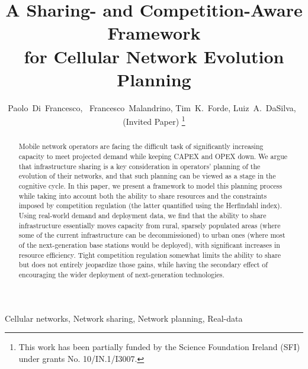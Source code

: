 \documentclass[10pt,journal,cspaper,compsoc]{IEEEtran}
\begin{document}

\title{
A Sharing- and Competition-Aware Framework\\
for Cellular Network Evolution Planning
}
\author{Paolo~Di~Francesco,~
        Francesco~Malandrino, Tim~K.~Forde, Luiz~A.~DaSilva,~\\
        (Invited Paper)
\thanks{This work has been partially funded by the Science Foundation Ireland (SFI) under grants No. 10/IN.1/I3007.}}
\maketitle
\thispagestyle{empty}\pagestyle{plain}

\vspace{-2cm}
\begin{abstract}

Mobile network operators are facing the difficult task of significantly increasing capacity to meet projected
demand while keeping CAPEX and OPEX down. We argue that infrastructure sharing is a key consideration in 
operators' planning of the evolution of their networks, and that such planning can be viewed as a stage in the 
cognitive cycle. In this paper, we present a framework to model this planning process while taking into account 
both the ability to share resources and the constraints imposed by competition regulation (the latter quantified 
using the Herfindahl index). 
Using real-world demand and deployment data, we find that the ability to share infrastructure essentially moves 
capacity from rural, sparsely populated areas (where some of the current infrastructure can be decommissioned) to 
urban ones (where most of the next-generation base stations would be deployed), with significant increases in 
resource efficiency.
Tight competition regulation somewhat limits the ability to share but does not entirely 
jeopardize those gains, while having the secondary effect of encouraging the wider deployment of next-generation 
technologies.

\end{abstract}

\begin{keywords}
Cellular networks, Network sharing, Network planning, Real-data
\end{keywords}
\end{document}
